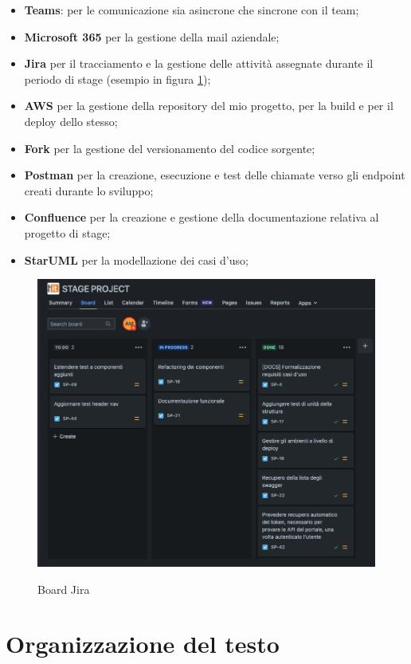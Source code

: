 \begin{itemize}
  \item \textbf{Teams}: per le comunicazione sia asincrone che sincrone con il team;
  \item \textbf{Microsoft 365} per la gestione della mail aziendale;
  \item \textbf{Jira} per il tracciamento e la gestione delle attività assegnate durante il periodo di stage (esempio in figura \ref{fig:board-jira});
  \item \textbf{AWS} per la gestione della repository del mio progetto, per la build e per il deploy dello stesso;
  \item \textbf{Fork} per la gestione del versionamento del codice sorgente;
  \item \textbf{Postman} per la creazione, esecuzione e test delle chiamate verso gli endpoint creati durante lo sviluppo;
  \item \textbf{Confluence} per la creazione e gestione della documentazione relativa al progetto di stage;
  \item \textbf{StarUML} per la modellazione dei casi d'uso;
\end{itemize}

\begin{figure}[!ht] 
  \centering 
  \includegraphics[width=0.9\columnwidth, alt={Esempio di utilizzo della board di Jira}]{images/Board.jpg}
  \caption{Board Jira}\label{fig:board-jira}
\end{figure}

\section{Organizzazione del testo}

